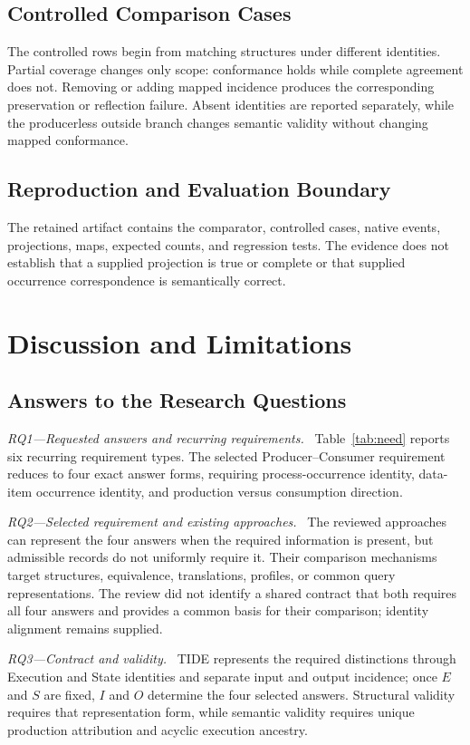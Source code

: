 \documentclass[conference]{IEEEtran}
\theoremstyle{tideproposition}
\newcommand{\reviewitem}[1]{\par\addvspace{0.22\baselineskip}\noindent\emph{#1.}\ }
\begin{document}
\subsection{Controlled Comparison Cases}
The controlled rows begin from matching structures under different identities. Partial coverage changes only scope: conformance holds while complete agreement does not. Removing or adding mapped incidence produces the corresponding preservation or reflection failure. Absent identities are reported separately, while the producerless outside branch changes semantic validity without changing mapped conformance.

\subsection{Reproduction and Evaluation Boundary}
The retained artifact contains the comparator, controlled cases, native
events, projections, maps, expected counts, and regression tests. The evidence
does not establish that a supplied projection is true or complete or that
supplied occurrence correspondence is semantically correct.

\FloatBarrier
\section{Discussion and Limitations}
\subsection{Answers to the Research Questions}

\reviewitem{RQ1---Requested answers and recurring requirements}
Table~\ref{tab:need} reports six recurring requirement types. The selected
Producer--Consumer requirement reduces to four exact answer forms, requiring
process-occurrence identity, data-item occurrence identity, and production
versus consumption direction.

\reviewitem{RQ2---Selected requirement and existing approaches}
The reviewed approaches can represent the four answers when the required information is present, but admissible records do not uniformly require it. Their comparison mechanisms target structures, equivalence, translations, profiles, or common query representations. The review did not identify a shared contract that both requires all four answers and provides a common basis for their comparison; identity alignment remains supplied.

\reviewitem{RQ3---Contract and validity}
TIDE represents the required distinctions through Execution and State identities
and separate input and output incidence; once $E$ and $S$ are fixed, $I$ and $O$ determine the four
selected answers. Structural validity requires that representation form, while
semantic validity requires unique production attribution and acyclic execution ancestry.
\end{document}
